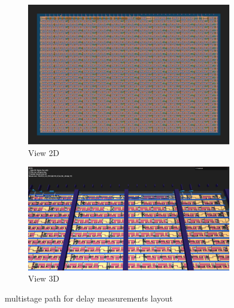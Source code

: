 \begin{figure}[H]
    \centering
    \begin{subfigure}[b]{0.45\textwidth}
        \includegraphics[width=\linewidth]{Pictures/Result_Delay_2D_View.png}
        \caption{View 2D}\label{fig:delay_2D}
    \end{subfigure}
    \begin{subfigure}[b]{0.45\textwidth}
        \includegraphics[width=\linewidth]{Pictures/Result_Delay_3D_View.png}
        \caption{View 3D}\label{fig:delay_3D}
    \end{subfigure}
    \caption{multistage path for delay measurements layout}\label{fig:delay_Layout}
\end{figure}

